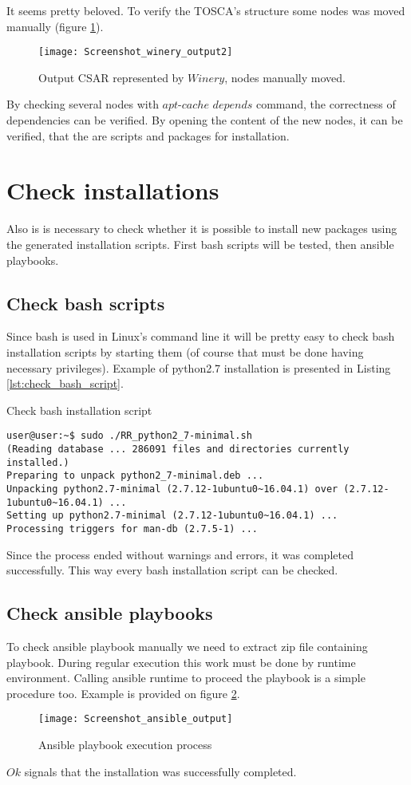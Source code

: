  It seems pretty beloved.
 To verify the TOSCA's structure some nodes was moved manually (figure \ref{fig:winery_output2}). 
 \begin{figure}[ht]   
 	\centering
 	\texttt{[image: Screenshot\_winery\_output2]}
 	\caption{Output CSAR represented by $Winery$, nodes manually moved.}
 	\label{fig:winery_output2}
 \end{figure}
 By checking several nodes with $apt$-$cache$ $depends$ command, the correctness of dependencies can be verified.
 By opening the content of the new nodes, it can be verified, that the are scripts and packages for installation.

\section{Check installations}
Also is is necessary to check whether it is possible to install new packages using the generated installation scripts.
First bash scripts will be tested, then ansible playbooks.
\subsection{Check bash scripts}
Since bash is used in Linux's command line it will be pretty easy to check bash installation scripts by starting them (of course that must be done having necessary privileges).
Example of python2.7 installation is presented in Listing \ref{lst:check_bash_script}.\\
\begin{Listing}
\caption{Check bash installation script}
\label{lst:check_bash_script}
\begin{lstlisting}
user@user:~$ sudo ./RR_python2_7-minimal.sh 
(Reading database ... 286091 files and directories currently installed.)
Preparing to unpack python2_7-minimal.deb ...
Unpacking python2.7-minimal (2.7.12-1ubuntu0~16.04.1) over (2.7.12-1ubuntu0~16.04.1) ...
Setting up python2.7-minimal (2.7.12-1ubuntu0~16.04.1) ...
Processing triggers for man-db (2.7.5-1) ...
\end{lstlisting}
\end{Listing}
Since the process ended without warnings and errors, it was completed successfully.
This way every bash installation script can be checked.

\subsection{Check ansible playbooks}
To check ansible playbook manually we need to extract zip file containing playbook. 
During regular execution this work must be done by runtime environment.
Calling ansible runtime to proceed the playbook is a simple procedure too.
Example is provided on figure \ref{fig:ansible_output2}.\\
 \begin{figure}[ht]   
	\centering
	\texttt{[image: Screenshot\_ansible\_output]}
	\caption{Ansible playbook execution process}
	\label{fig:ansible_output2}
\end{figure}
$Ok$ signals that the installation was successfully completed.